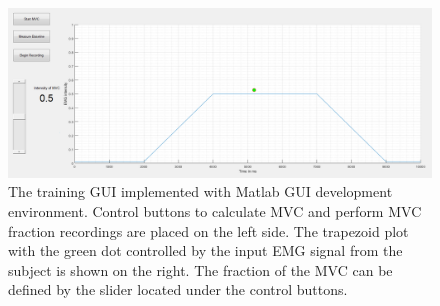 \begin{figure}[H]
	\includegraphics[width=.9\textwidth]{figures/GUI/GUI_Training.png}
	\caption{The training GUI implemented with Matlab GUI development environment. Control buttons to calculate MVC and perform MVC fraction recordings are placed on the left side. The trapezoid plot with the green dot controlled by the input EMG signal from the subject is shown on the right. The fraction of the MVC can be defined by the slider located under the control buttons.}
	\label{fig:GUI_Training}
\end{figure} 


